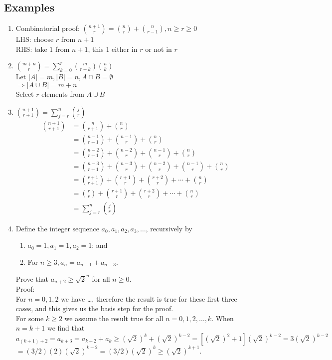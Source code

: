 \documentclass[a4paper]{article}
\begin{document}
\subsection*{Examples}
\begin{enumerate}
    \item Combinatorial proof: $\binom{n+1}{r}=\binom{n}{r}+\binom{n}{r-1}, n\geq r\geq 0$\\
    LHS: choose $r$ from $n+1$\\
    RHS: take $1$ from $n+1$, this $1$ either in $r$ or not in $r$
    \item $\binom{m+n}{r}=\sum_{k=0}^{r}{\binom{m}{r-k}\binom{n}{k}}$\\
    Let $|A|=m,|B|=n,A\cap B=\emptyset$\\
    $\Rightarrow |{A \cup B}|=m+n$\\
    Select $r$ elements from ${A \cup B}$
    \item $\binom{n+1}{r+1}=\sum_{j=r}^{n}{\binom{j}{r}}$
    \begin{align*}
    \binom{n+1}{r+1}&=\binom{n}{r+1}+\binom{n}{r}\\
    &=\binom{n-1}{r+1}+\binom{n-1}{r}+\binom{n}{r}\\
    &=\binom{n-2}{r+1}+\binom{n-2}{r}+\binom{n-1}{r}+\binom{n}{r}\\
    &=\binom{n-3}{r+1}+\binom{n-3}{r}+\binom{n-2}{r}+\binom{n-1}{r}+\binom{n}{r}\\
    &=\binom{r+1}{r+1}+\binom{r+1}{r}+\binom{r+2}{r}+\cdots+\binom{n}{r}\\
    &=\binom{r}{r}+\binom{r+1}{r}+\binom{r+2}{r}+\cdots+\binom{n}{r}\\
    &=\sum_{j=r}^{n}{\binom{j}{r}}
    \end{align*}
    \item Define the integer sequence $a_0,a_1,a_2,a_3,\ldots$, recursively by
    \begin{enumerate}
        \item $a_0=1,a_1=1,a_2=1$; and
        \item For $n\geq 3, a_n=a_{n-1}+a_{n-3}$.
    \end{enumerate}
    Prove that $a_{n+2}\geq {\sqrt{2}}^n$ for all $n\geq0$.\\
    Proof:\\
    For $n=0,1,2$ we have \ldots, therefore the result is true for these first three cases, and this gives us the basis step for the proof.\\
    For some $k\geq 2$ we assume the result true for all $n=0,1,2,\ldots,k$. When $n=k+1$ we find that\\
    $a_{(k+1)+2}=a_{k+3}=a_{k+2}+a_k\geq (\sqrt{2})^k+(\sqrt{2})^{k-2}=[(\sqrt{2})^2+1](\sqrt{2})^{k-2}=3(\sqrt{2})^{k-2}$\\
    $=(3/2)(2)(\sqrt{2})^{k-2}=(3/2)(\sqrt{2})^k\geq (\sqrt{2})^{k+1}$.
\end{enumerate}
\end{document}
